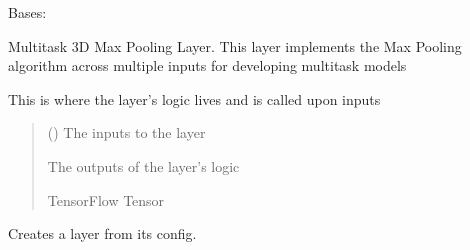 \documentclass[letterpaper,10pt,english]{sphinxmanual}
\begin{document}
\begin{fulllineitems}
\label{\detokenize{beyondml.tflow.layers:beyondml.tflow.layers.MultiMaxPool3D.MultiMaxPool3D}}
\pysigstartsignatures
{}
\pysigstopsignatures
\sphinxAtStartPar
Bases: 

\sphinxAtStartPar
Multitask 3D Max Pooling Layer. This layer implements the Max Pooling
algorithm across multiple inputs for developing multitask models

\begin{fulllineitems}
\label{\detokenize{beyondml.tflow.layers:beyondml.tflow.layers.MultiMaxPool3D.MultiMaxPool3D.call}}
\pysigstartsignatures
{}
\pysigstopsignatures
\sphinxAtStartPar
This is where the layer’s logic lives and is called upon inputs
\begin{quote}\begin{description}
\sphinxAtStartPar
{} () \textendash{} The inputs to the layer

\sphinxAtStartPar
{} \textendash{} The outputs of the layer’s logic

\sphinxAtStartPar
TensorFlow Tensor

\end{description}\end{quote}

\end{fulllineitems}


\begin{fulllineitems}
\label{\detokenize{beyondml.tflow.layers:beyondml.tflow.layers.MultiMaxPool3D.MultiMaxPool3D.from_config}}
\pysigstartsignatures
{}
\pysigstopsignatures
\sphinxAtStartPar
Creates a layer from its config.


\end{fulllineitems}
\end{fulllineitems}
\end{document}
